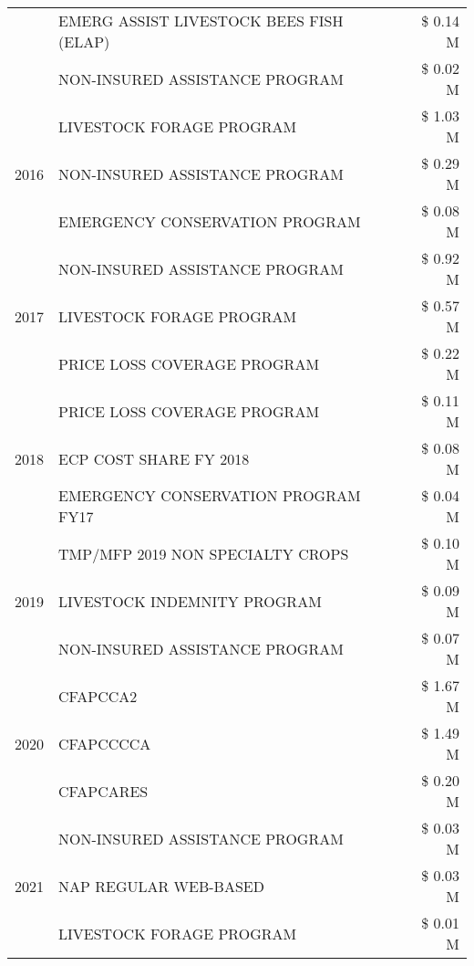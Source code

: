 \begin{tabular}{llr}
 & EMERG ASSIST LIVESTOCK BEES FISH (ELAP) & \$ 0.14 M \\
 & NON-INSURED ASSISTANCE PROGRAM & \$ 0.02 M \\
\cline{1-3}
\multirow[t]{3}{*}{2016} & LIVESTOCK FORAGE PROGRAM & \$ 1.03 M \\
 & NON-INSURED ASSISTANCE PROGRAM & \$ 0.29 M \\
 & EMERGENCY CONSERVATION PROGRAM & \$ 0.08 M \\
\cline{1-3}
\multirow[t]{3}{*}{2017} & NON-INSURED ASSISTANCE PROGRAM & \$ 0.92 M \\
 & LIVESTOCK FORAGE PROGRAM & \$ 0.57 M \\
 & PRICE LOSS COVERAGE PROGRAM & \$ 0.22 M \\
\cline{1-3}
\multirow[t]{3}{*}{2018} & PRICE LOSS COVERAGE PROGRAM & \$ 0.11 M \\
 & ECP COST SHARE FY 2018 & \$ 0.08 M \\
 & EMERGENCY CONSERVATION PROGRAM FY17 & \$ 0.04 M \\
\cline{1-3}
\multirow[t]{3}{*}{2019} & TMP/MFP 2019 NON SPECIALTY CROPS & \$ 0.10 M \\
 & LIVESTOCK INDEMNITY PROGRAM & \$ 0.09 M \\
 & NON-INSURED ASSISTANCE PROGRAM & \$ 0.07 M \\
\cline{1-3}
\multirow[t]{3}{*}{2020} & CFAPCCA2 & \$ 1.67 M \\
 & CFAPCCCCA & \$ 1.49 M \\
 & CFAPCARES & \$ 0.20 M \\
\cline{1-3}
\multirow[t]{3}{*}{2021} & NON-INSURED ASSISTANCE PROGRAM & \$ 0.03 M \\
 & NAP REGULAR WEB-BASED & \$ 0.03 M \\
 & LIVESTOCK FORAGE PROGRAM & \$ 0.01 M \\
\cline{1-3}
\bottomrule
\end{tabular}
